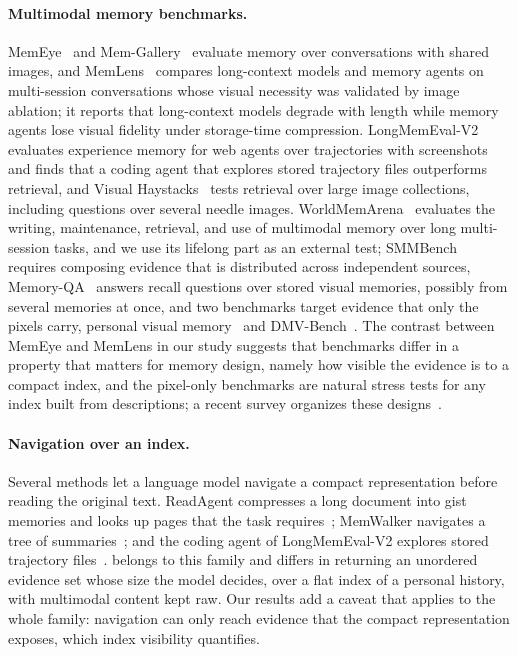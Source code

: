 \paragraph{Multimodal memory benchmarks.} MemEye~\citep{guo2026memeye} and Mem-Gallery~\citep{bei2026memgallery} evaluate memory over conversations with shared images, and MemLens~\citep{ren2026memlens} compares long-context models and memory agents on multi-session conversations whose visual necessity was validated by image ablation; it reports that long-context models degrade with length while memory agents lose visual fidelity under storage-time compression. LongMemEval-V2~\citep{wu2026lmev2} evaluates experience memory for web agents over trajectories with screenshots and finds that a coding agent that explores stored trajectory files outperforms retrieval, and Visual Haystacks~\citep{wu2025visualhaystacks} tests retrieval over large image collections, including questions over several needle images. WorldMemArena~\citep{liu2026worldmemarena} evaluates the writing, maintenance, retrieval, and use of multimodal memory over long multi-session tasks, and we use its lifelong part as an external test; SMMBench~\citep{chai2026smmbench} requires composing evidence that is distributed across independent sources, Memory-QA~\citep{jiang2025memoryqa} answers recall questions over stored visual memories, possibly from several memories at once, and two benchmarks target evidence that only the pixels carry, personal visual memory~\citep{nguyen2026personalvisual} and DMV-Bench~\citep{tang2026dmvbench}. The contrast between MemEye and MemLens in our study suggests that benchmarks differ in a property that matters for memory design, namely how visible the evidence is to a compact index, and the pixel-only benchmarks are natural stress tests for any index built from descriptions; a recent survey organizes these designs~\citep{guo2026seeingsurvey}.

\paragraph{Navigation over an index.} Several methods let a language model navigate a compact representation before reading the original text. ReadAgent compresses a long document into gist memories and looks up pages that the task requires~\citep{lee2024readagent}; MemWalker navigates a tree of summaries~\citep{chen2023memwalker}; and the coding agent of LongMemEval-V2 explores stored trajectory files~\citep{wu2026lmev2}. \qss{} belongs to this family and differs in returning an unordered evidence set whose size the model decides, over a flat index of a personal history, with multimodal content kept raw. Our results add a caveat that applies to the whole family: navigation can only reach evidence that the compact representation exposes, which index visibility quantifies.

